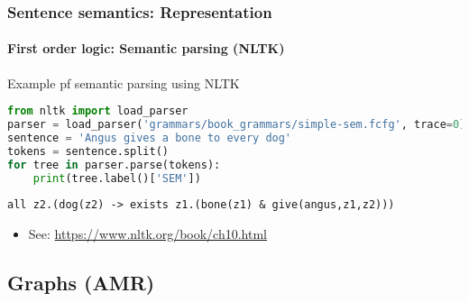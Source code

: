 \documentclass[xcolor=table]{beamer}
\begin{document}
\begin{frame}[fragile]
	\frametitle{Sentence semantics: Representation}
	\framesubtitle{First order logic: Semantic parsing (NLTK)}
	
	\begin{exampleblock}{Example pf semantic parsing using NLTK}
	{\scriptsize
		\begin{lstlisting}[language=Python]
from nltk import load_parser
parser = load_parser('grammars/book_grammars/simple-sem.fcfg', trace=0)
sentence = 'Angus gives a bone to every dog'
tokens = sentence.split()
for tree in parser.parse(tokens):
    print(tree.label()['SEM'])
		\end{lstlisting}
	}

	{\scriptsize\bfseries
	\begin{lstlisting}
all z2.(dog(z2) -> exists z1.(bone(z1) & give(angus,z1,z2)))
	\end{lstlisting}
	}
	
	\end{exampleblock}

	\begin{itemize}
		\item See: \url{https://www.nltk.org/book/ch10.html}
	\end{itemize}
	
\end{frame}

\subsection{Graphs (AMR)}
\end{document}

